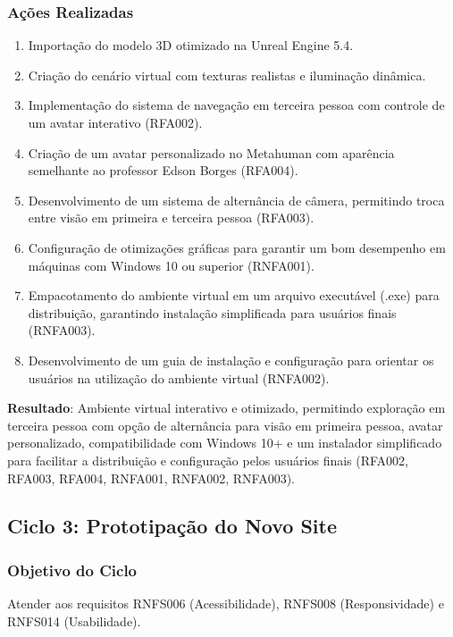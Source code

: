 \subsubsection*{Ações Realizadas}
\begin{enumerate}
    \item Importação do modelo 3D otimizado na Unreal Engine 5.4.
    \item Criação do cenário virtual com texturas realistas e iluminação dinâmica.
    \item Implementação do sistema de navegação em terceira pessoa com controle de um avatar interativo (RFA002).
    \item Criação de um avatar personalizado no Metahuman com aparência semelhante ao professor Edson Borges (RFA004).
    \item Desenvolvimento de um sistema de alternância de câmera, permitindo troca entre visão em primeira e terceira pessoa (RFA003).
    \item Configuração de otimizações gráficas para garantir um bom desempenho em máquinas com Windows 10 ou superior (RNFA001).
    \item Empacotamento do ambiente virtual em um arquivo executável (.exe) para distribuição, garantindo instalação simplificada para usuários finais (RNFA003).
    \item Desenvolvimento de um guia de instalação e configuração para orientar os usuários na utilização do ambiente virtual (RNFA002).
\end{enumerate}

\textbf{Resultado}: Ambiente virtual interativo e otimizado, permitindo exploração em terceira pessoa com opção de alternância para visão em primeira pessoa, avatar personalizado, compatibilidade com Windows 10+ e um instalador simplificado para facilitar a distribuição e configuração pelos usuários finais (RFA002, RFA003, RFA004, RNFA001, RNFA002, RNFA003).

\subsection*{Ciclo 3: Prototipação do Novo Site} \label{subsec:ciclo3}

\subsubsection*{Objetivo do Ciclo}
Atender aos requisitos RNFS006 (Acessibilidade), RNFS008 (Responsividade) e RNFS014 (Usabilidade).

